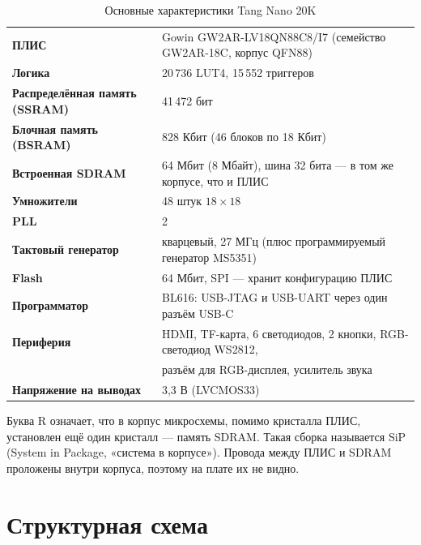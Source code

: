 \begin{table}[H]
\centering
\caption{Основные характеристики Tang Nano 20K}
\label{tab:specs}
\small
\begin{tabularx}{0.95\textwidth}{>{\bfseries}l X}
\toprule
ПЛИС                 & Gowin GW2AR-LV18QN88C8/I7 (семейство GW2AR-18C, корпус QFN88) \\
Логика               & 20\,736 LUT4, 15\,552 триггеров \\
Распределённая память (SSRAM) & 41\,472 бит \\
Блочная память (BSRAM) & 828 Кбит (46 блоков по 18 Кбит) \\
Встроенная SDRAM     & 64 Мбит (8 Мбайт), шина 32 бита --- в том же корпусе, что и ПЛИС \\
Умножители           & 48 штук $18\times18$ \\
PLL                  & 2 \\
Тактовый генератор   & кварцевый, 27 МГц (плюс программируемый генератор MS5351) \\
Flash                & 64 Мбит, SPI --- хранит конфигурацию ПЛИС \\
Программатор         & BL616: USB-JTAG и USB-UART через один разъём USB-C \\
Периферия            & HDMI, TF-карта, 6 светодиодов, 2 кнопки, RGB-светодиод WS2812, \\
                     & разъём для RGB-дисплея, усилитель звука \\
Напряжение на выводах & 3,3 В (LVCMOS33) \\
\bottomrule
\end{tabularx}
\end{table}

\begin{infobox}
Буква R означает, что в корпус микросхемы, помимо кристалла ПЛИС, установлен ещё
один кристалл --- память SDRAM. Такая сборка называется SiP
(System in Package, «система в корпусе»). Провода между ПЛИС и SDRAM проложены
внутри корпуса, поэтому на плате их не видно.
\end{infobox}

\section{Структурная схема}

